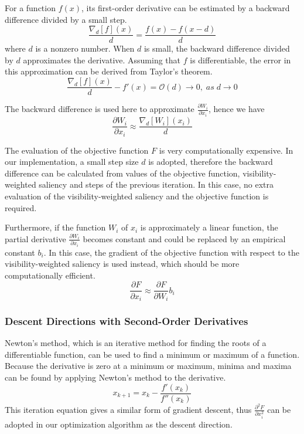 For a function $ f(x) $, its first-order derivative can be estimated by a backward difference divided by a small step.
\[ \frac{\nabla_{d}[f](x)}{d}=\frac{f(x)-f(x-d)}{d} \]
where $ d $ is a nonzero number.
When $ d $ is small, the backward difference divided by $ d $ approximates the derivative. Assuming that $ f $ is differentiable, the error in this approximation can be derived from Taylor's theorem.
\[ \frac{\nabla_{d}[f](x)}{d}-f'(x)=\mathcal{O}(d) \to 0 , \; as \; d \to 0 \]

The backward difference is used here to approximate $ \frac{\partial W_{i}}{\partial x_{i}} $, hence we have
\[ \frac{\partial W_{i}}{\partial x_{i}} \approx \frac{\nabla_{d}[W_{i}](x_{i})}{d} \]

The evaluation of the objective function $ F $ is very computationally expensive. In our implementation, a small step size $ d $ is adopted, therefore the backward difference can be calculated from values of the objective function, visibility-weighted saliency and steps of the previous iteration. In this case, no extra evaluation of the visibility-weighted saliency and the objective function is required.

Furthermore, if the function $ W_{i} $ of $ x_{i} $ is approximately a linear function, the partial derivative $ \frac{\partial W_{i}}{\partial x_{i}} $ becomes constant and could be replaced by an empirical constant $ b_{i} $. In this case, the gradient of the objective function with respect to the visibility-weighted saliency is used instead, which should be more computationally efficient.
\[ \frac{\partial F}{\partial x_{i}} \approx \frac{\partial F}{\partial W_{i}} b_{i} \]

\subsubsection{Descent Directions with Second-Order Derivatives}
Newton's method, which is an iterative method for finding the roots of a differentiable function, can be used to find a minimum or maximum of a function. Because the derivative is zero at a minimum or maximum, minima and maxima can be found by applying Newton's method to the derivative.
\[ x_{k+1}=x_{k}- \frac{f'(x_{k})}{f''(x_{k})} \]
This iteration equation gives a similar form of gradient descent, thus $ \frac{\partial^2 F}{\partial x_{i}^2} $ can be adopted in our optimization algorithm as the descent direction.


